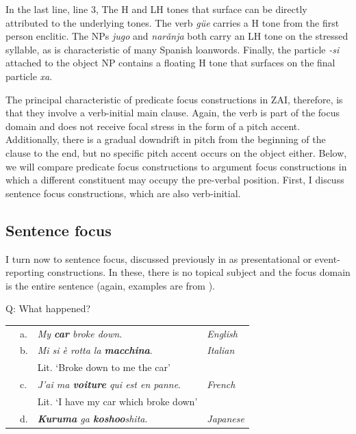 In the last line, line 3, The H and LH tones that surface can be directly attributed to the underlying tones. The verb \textit{g\"{u}e} carries a H tone from the first person enclitic. The NPs \textit{jugo} and  \textit{nar\v{a}nja} both carry an LH tone on the stressed syllable, as is characteristic of many Spanish loanwords. Finally, the particle \textit{-si} attached to the object NP contains a floating H tone that surfaces on the final particle \textit{xa}. 

The principal characteristic of predicate focus constructions in ZAI, therefore, is that they involve a verb-initial main clause. Again, the verb is part of the focus domain and does not receive focal stress in the form of a pitch accent. Additionally, there is a gradual downdrift in pitch from the beginning of the clause to the end, but no specific pitch accent occurs on the object either. Below, we will compare predicate focus constructions to argument focus constructions in which a different constituent may occupy the pre-verbal position. First, I discuss sentence focus constructions, which are also verb-initial.



\subsection{Sentence focus}\label{sfsection}

I turn now to sentence focus, discussed previously in  as presentational or event-reporting constructions. In these, there is no topical subject and the focus domain is the entire sentence (again, examples are from \citet{lambrecht1994}). 


\ea\label{SF}
{Q: What happened?} \\
\begin{table} 
\begin{tabular}{l l l l}
 & a. & \textit{My \textbf{car} broke down}. & \textit{English} \\
 & b. & \textit{Mi si \`{e} rotta la \textbf{macchina}}. & \textit{Italian}  \\
  & & Lit. `Broke down to me the car'  \\
 & c. & \textit{J'ai ma \textbf{voiture} qui est en panne}. & \textit{French}  \\
  & & Lit. `I have my car which broke down' \\
   & d. & \textit{\textbf{Kuruma} ga \textbf{koshoo}shita}. & \textit{Japanese}  \\
\end{tabular}
\end{table}
\z

